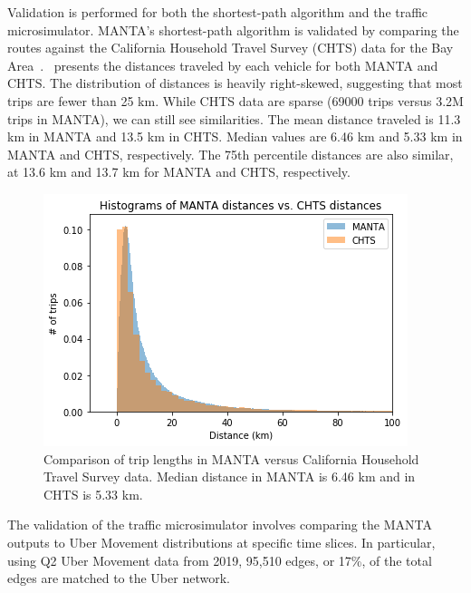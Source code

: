 \documentclass[final]{IEEEtran}
\begin{document}

Validation is performed for both the shortest-path algorithm and the traffic microsimulator. MANTA's shortest-path algorithm is validated by comparing the routes against the California Household Travel Survey (CHTS) data for the Bay Area~\cite{nationalrenewableenergylaboratoryTransportationSecureData}.~ presents the distances traveled by each vehicle for both MANTA and CHTS. The distribution of distances is heavily right-skewed, suggesting that most trips are fewer than 25 km.  While CHTS data are sparse (69000 trips versus 3.2M trips in MANTA), we can still see similarities. The mean distance traveled is 11.3 km in MANTA and 13.5 km in CHTS. Median values are 6.46 km and 5.33 km in MANTA and CHTS, respectively. The 75th percentile distances are also similar, at 13.6 km and 13.7 km for MANTA and CHTS, respectively.

\begin{figure}
    \centering
    \includegraphics[width=.45\textwidth]{figs/manta_vs_chts_shortest_path.png}
    \caption{Comparison of trip lengths in MANTA versus California Household Travel Survey data. Median distance in MANTA is 6.46 km and in CHTS is 5.33 km.}
    \label{fig:distance}
\end{figure}


The validation of the traffic microsimulator involves comparing the MANTA outputs to Uber Movement distributions at specific time slices. In particular, using Q2 Uber Movement data from 2019, 95,510 edges, or 17\%, of the total edges are matched to the Uber network.
\end{document}
